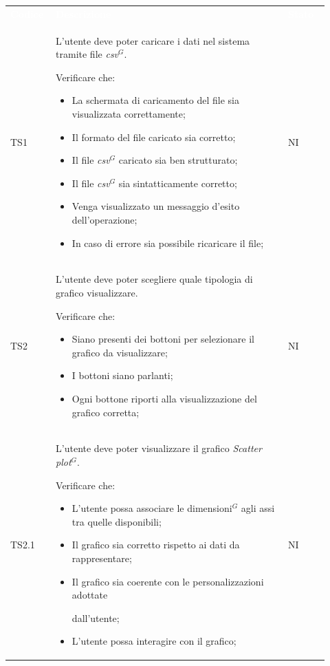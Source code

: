 \renewcommand{\arraystretch}{1.5}
\begin{longtable}{p{0.12\linewidth}p{0.68\linewidth}p{0.12\linewidth}}
	\rowcolor[RGB]{33, 73, 50}
	\textcolor{white}{\textbf{Codice}} & \textcolor{white}{\textbf{Descrizione}} & \textcolor{white}{\textbf{Stato}}\\
    
    \rowcolor[RGB]{233, 245, 206}
    TS1 & 
    L'utente deve poter caricare i dati nel sistema tramite file \textit{csv}$^{G}$. \par Verificare che: 
    \begin{itemize}
        \item La schermata di caricamento del file sia visualizzata correttamente;
        \item Il formato del file caricato sia corretto;
        \item Il file \textit{csv}$^{G}$ caricato sia ben strutturato;
        \item Il file \textit{csv}$^{G}$ sia sintatticamente corretto;
        \item Venga visualizzato un messaggio d'esito dell'operazione; 
        \item In caso di errore sia possibile ricaricare il file;
    \end{itemize}&
    NI \\

    \rowcolor[RGB]{216, 235, 171}
    TS2 &
    L'utente deve poter scegliere quale tipologia di grafico visualizzare. \par Verificare che:
    \begin{itemize}
        \item Siano presenti dei bottoni per selezionare il grafico da visualizzare;
        \item I bottoni siano parlanti;
        \item Ogni bottone riporti alla visualizzazione del grafico corretta;
    \end{itemize}&
    NI\\

    \rowcolor[RGB]{233, 245, 206}
    TS2.1 & 
    L'utente deve poter visualizzare il grafico \textit{Scatter plot}$^{G}$. 
    \par Verificare che: 
    \begin{itemize}
        \item L'utente possa associare le dimensioni$^{G}$ agli assi tra quelle disponibili;
        \item Il grafico sia corretto rispetto ai dati da rappresentare;
        \item Il grafico sia coerente con le personalizzazioni adottate \par dall'utente;
        \item L'utente possa interagire con il grafico;
    \end{itemize}&
    NI\\


\end{longtable}
